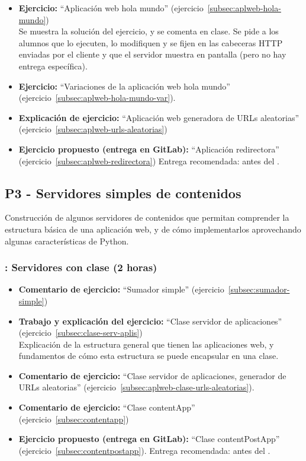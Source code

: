 \documentclass[a4paper,12pt]{article}
\begin{document}
\begin{itemize}
 \item \textbf{Ejercicio:} ``Aplicación web hola mundo'' (ejercicio~\ref{subsec:aplweb-hola-mundo}) \\
   Se muestra la solución del ejercicio, y se comenta en clase. Se pide a los alumnos que lo ejecuten, lo modifiquen y se fijen en las cabeceras HTTP enviadas por el cliente y que el servidor muestra en pantalla (pero no hay entrega específica).
 \item \textbf{Ejercicio:} ``Variaciones de la aplicación web hola mundo'' (ejercicio~\ref{subsec:aplweb-hola-mundo-var}).
\item \textbf{Explicación de ejercicio:} ``Aplicación web generadora de URLs aleatorias'' (ejercicio~\ref{subsec:aplweb-urls-aleatorias})
\item \textbf{Ejercicio propuesto (entrega en GitLab):} ``Aplicación redirectora'' (ejercicio~\ref{subsec:aplweb-redirectora})
   Entrega recomendada: antes del \lunesE.
\end{itemize}


\subsection{P3 - Servidores simples de contenidos}

Construcción de algunos servidores de contenidos que permitan comprender la estructura básica de una aplicación web, y de cómo implementarlos aprovechando algunas características de Python.

\subsubsection{\lunesE: Servidores con clase (2 horas)}
\label{cal:lunesE}

\begin{itemize}
\item \textbf{Comentario de ejercicio:} ``Sumador simple'' (ejercicio~\ref{subsec:sumador-simple}) 
\item \textbf{Trabajo y explicación del ejercicio:} ``Clase servidor de aplicaciones'' (ejercicio~\ref{subsec:clase-serv-aplis}) \\
  Explicación de la estructura general que tienen las aplicaciones web, y fundamentos de cómo esta estructura se puede encapsular en una clase.
\item \textbf{Comentario de ejercicio:} ``Clase servidor de aplicaciones, generador de URLs aleatorias'' (ejercicio~\ref{subsec:aplweb-clase-urls-aleatorias}). 
 \item \textbf{Comentario de ejercicio:}  ``Clase contentApp'' (ejercicio~\ref{subsec:contentapp}) 
 \item \textbf{Ejercicio propuesto (entrega en GitLab):} ``Clase contentPostApp'' (ejercicio~\ref{subsec:contentpostapp}).
  Entrega recomendada: antes del \lunesF.
\end{itemize}
\end{document}
